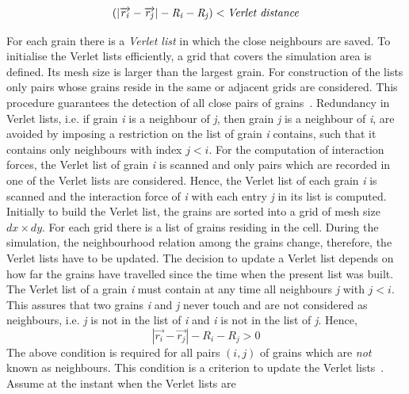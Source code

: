 \begin{equation}
(\left|\overrightarrow{r_{\mathit{i}}}-\overrightarrow{r_{\mathit{j}}}\right|-\mathit{R}_{\mathit{i}}-\mathit{R}_{\mathit{j}})<\mbox{\textit{Verlet
 distance}}
\end{equation}

For each grain there is a \textit{Verlet list} in which the close 
neighbours are saved. To 
initialise the Verlet lists efficiently, a grid that covers the simulation 
area is defined. Its 
mesh size is larger than the largest grain. For construction of the lists 
only pairs whose 
grains reside in the same or adjacent grids are considered. This procedure 
guarantees the 
detection of all close pairs of grains~\citep{Posch2005}. Redundancy in 
Verlet lists, i.e. if 
grain \textit{i} is a neighbour of \textit{j}, then grain \textit{j} is 
a neighbour of 
\textit{i}, are avoided by imposing a restriction on the list of grain 
\textit{i} contains, 
such 
that it contains only neighbours with index $\mathit{j}<\mathit{i}$. For the 
computation of 
interaction forces, the Verlet list of grain \textit{i} is scanned and only 
pairs which are 
recorded in one of the Verlet lists are considered. Hence, the Verlet list of 
each grain 
\textit{i} is scanned and the interaction force of \textit{i} with each entry 
\textit{j} in its 
list is computed. Initially to build the Verlet list, the grains are sorted 
into a grid of mesh 
size $\mathit{dx}\times\mathit{dy}$. For each grid there is a list of 
grains residing in the 
cell. During the simulation, the neighbourhood relation among the grains 
change, therefore, the 
Verlet lists have to be updated. The decision to update a Verlet list depends 
on how far the 
grains have travelled since the time when the present list was built. The 
Verlet list of a 
grain \textit{i} must contain at any time all neighbours \textit{j} with 
$\mathit{j}<\mathit{i}$. This assures that two grains \textit{i} and 
\textit{j} never touch and 
are not considered as neighbours, i.e. \textit{j} is not in the list of 
\textit{i} and \textit{i} 
is not in the list of \textit{j}. Hence,
%
\begin{equation}
\left|\overrightarrow{r_{\mathit{i}}}-\overrightarrow{r_{\mathit{j}}}\right|-\mathit{R}_{\mathit{i}}-\mathit{R}_{\mathit{j}}>0
\end{equation}
%
The above condition is required for all pairs $(\mathit{i},\mathit{j})$ of 
grains which are 
\textit{not} known as neighbours. This condition is a criterion to update the 
Verlet 
lists~\citep{Posch2005}. Assume at the instant when the Verlet lists are 
